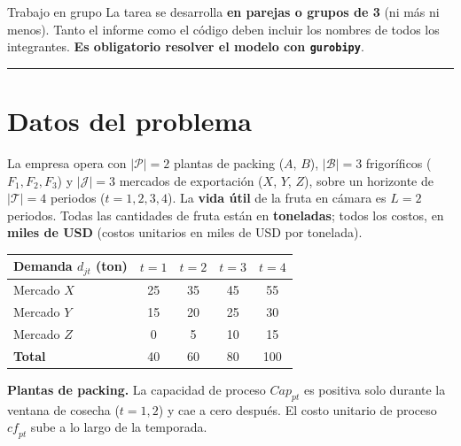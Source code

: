 \documentclass[12pt,a4paper]{article}
\begin{document}
\begin{ayuda}{Trabajo en grupo}
\vspace{2pt}
La tarea se desarrolla \textbf{en parejas o grupos de 3} (ni más ni menos). Tanto
el informe como el código deben incluir los nombres de todos los integrantes.
\textbf{Es obligatorio resolver el modelo con \texttt{gurobipy}}.
\end{ayuda}

\noindent\rule{\linewidth}{0.4pt}

\section*{Datos del problema}

La empresa opera con $|\mathcal{P}|=2$ plantas de packing ($A$, $B$),
$|\mathcal{B}|=3$ frigoríficos ($F_1, F_2, F_3$) y $|\mathcal{J}|=3$ mercados de
exportación ($X$, $Y$, $Z$), sobre un horizonte de $|\mathcal{T}|=4$ periodos
($t=1,2,3,4$). La \textbf{vida útil} de la fruta en cámara es $L=2$ periodos.
Todas las cantidades de fruta están en \textbf{toneladas}; todos los costos, en
\textbf{miles de USD} (costos unitarios en miles de USD por tonelada).

\begin{center}
\renewcommand{\arraystretch}{1.2}
\begin{tabular}{lcccc}
\toprule
\textbf{Demanda $d_{jt}$ (ton)} & \textbf{$t=1$} & \textbf{$t=2$} &
\textbf{$t=3$} & \textbf{$t=4$} \\
\midrule
Mercado $X$ & 25 & 35 & 45 & 55 \\
Mercado $Y$ & 15 & 20 & 25 & 30 \\
Mercado $Z$ & 0  & 5  & 10 & 15 \\
\midrule
\textbf{Total} & 40 & 60 & 80 & 100 \\
\bottomrule
\end{tabular}
\end{center}

\textbf{Plantas de packing.} La capacidad de proceso $\mathit{Cap}_{pt}$ es
positiva solo durante la ventana de cosecha ($t=1,2$) y cae a cero después. El
costo unitario de proceso $\mathit{cf}_{pt}$ sube a lo largo de la temporada.
\end{document}
